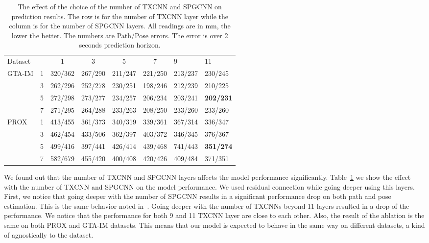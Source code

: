 \documentclass[10pt,twocolumn,letterpaper]{article}
\begin{document}
\begin{table}[ht]
\centering
\begin{tabular}{l|c|ccccll} 
\toprule
Dataset                 & & 1       & 3       & 5       & 7       & 9       & 11                \\ 
\cline{1-1}\cline{3-8}
\multirow{4}{*}{GTA-IM} & 1                    & 320/362 & 267/290 & 211/247 & 221/250 & 213/237 & 230/245           \\
                        & 3                    & 262/296 & 252/278 & 230/251 & 198/246 & 212/239 & 210/225           \\
                        & 5                    & 272/298 & 273/277 & 234/257 & 206/234 & 203/241 & \textbf{202/231}  \\
                        & 7                    & 271/295 & 264/288 & 233/263 & 208/250 & 233/260 & 233/260           \\ 
\hline
\multirow{4}{*}{PROX}   & 1                    & 413/455       & 361/373       & 340/319       & 339/361      & 367/314      & 336/347                \\
                        & 3                    & 462/454       & 433/506       & 362/397      & 403/372      & 346/345      & 376/367              \\
                        & 5                    & 499/416       & 397/441       & 426/414      & 439/468      & 741/443      & \textbf{351/274}               \\
                        & 7                    & 582/679       & 455/420       & 400/408      & 420/426     & 409/484      & 371/351                \\
\bottomrule
\end{tabular}
\caption{ The effect of the choice of the number of TXCNN and SPGCNN on prediction results. The row is for the number of TXCNN layer while the column is for the number of SPGCNN layers. All readings are in mm, the lower the better.  The numbers are Path/Pose errors. The error is over 2 seconds prediction horizon.}
\label{tab:ablation}
\end{table}

We found out that the number of TXCNN and SPGCNN layers affects the model performance significantly. Table~\ref{tab:ablation} we show the effect with the number of TXCNN and SPGCNN on the model performance. We used residual connection while going deeper using this layers. First, we notice that going deeper with the number of SPGCNN results in a significant performance drop on both path and pose estimation. This is the same behavior noted in~\cite{li2019deepgcns}. Going deeper with the number of TXCNNs beyond 11 layers resulted in a drop of the performance. We notice that the performance for both 9 and 11 TXCNN layer are close to each other. Also, the result of the ablation is the same on both PROX and GTA-IM datasets. This means that our model is expected to behave in the same way on different datasets, a kind of agnostically to the dataset.
\end{document}
